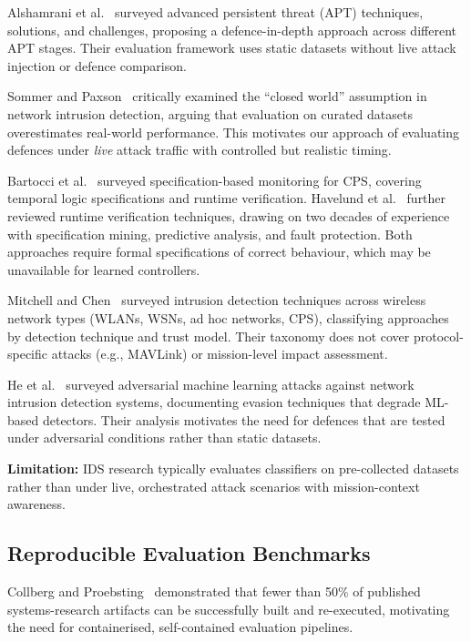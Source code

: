 Alshamrani et al.~\cite{alshamrani2019apt} surveyed advanced persistent threat (APT) techniques, solutions, and challenges, proposing a defence-in-depth approach across different APT stages.
Their evaluation framework uses static datasets without live attack injection or defence comparison.

Sommer and Paxson~\cite{sommer2010closedworld} critically examined the ``closed world'' assumption in network intrusion detection, arguing that evaluation on curated datasets overestimates real-world performance.
This motivates our approach of evaluating defences under \emph{live} attack traffic with controlled but realistic timing.

Bartocci et al.~\cite{bartocci2018specmonitoring} surveyed specification-based monitoring for CPS, covering temporal logic specifications and runtime verification.
Havelund et al.~\cite{havelund2019rv} further reviewed runtime verification techniques, drawing on two decades of experience with specification mining, predictive analysis, and fault protection.
Both approaches require formal specifications of correct behaviour, which may be unavailable for learned controllers.

Mitchell and Chen~\cite{mitchell2014wireless} surveyed intrusion detection techniques across wireless network types (WLANs, WSNs, ad hoc networks, CPS), classifying approaches by detection technique and trust model.
Their taxonomy does not cover protocol-specific attacks (e.g., MAVLink) or mission-level impact assessment.

He et al.~\cite{he2023advml} surveyed adversarial machine learning attacks against network intrusion detection systems, documenting evasion techniques that degrade ML-based detectors.
Their analysis motivates the need for defences that are tested under adversarial conditions rather than static datasets.

\textbf{Limitation:} IDS research typically evaluates classifiers on pre-collected datasets rather than under live, orchestrated attack scenarios with mission-context awareness.

\subsection{Reproducible Evaluation Benchmarks}

Collberg and Proebsting~\cite{collberg2016repeatability} demonstrated that fewer than 50\% of published systems-research artifacts can be successfully built and re-executed, motivating the need for containerised, self-contained evaluation pipelines.

